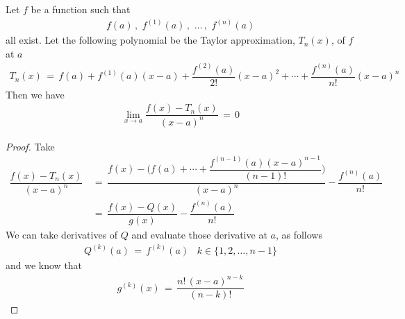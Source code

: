 \begin{theorem}
    Let $f$ be a function such that 
    \begin{align*}
        f(a) \hspace{2pt} , \hspace{4pt} f^{(1)}(a) \hspace{2pt} , \hspace{4pt} \dots \hspace{2pt} , \hspace{4pt} f^{(n)}(a)
    \end{align*}
    all exist. Let the following polynomial be the Taylor approximation, $T_{n}(x)$, of $f$ at $a$
    \begin{align*}
        T_{n}(x) \hspace{2pt} = \hspace{2pt} f(a) + f^{(1)}(a)(x - a) + \dfrac{f^{(2)}(a)}{2!}(x - a)^{2} + \cdots + \dfrac{f^{(n)}(a)}{n!}(x - a)^{n}
    \end{align*}
    Then we have
    \begin{align*}
        \lim_{x \longrightarrow a} \dfrac{f(x) - T_{n}(x)}{(x - a)^{n}} \hspace{2pt} = \hspace{2pt} 0
    \end{align*}
    \begin{proof}
        Take
        \begin{align*}
            \dfrac{f(x) - T_{n}(x)}{(x - a)^{n}} \hspace{2pt} &= \hspace{2pt} \dfrac{f(x) - \Big(f(a) + \cdots + \dfrac{f^{(n-1)}(a) (x - a)^{n-1}}{(n - 1)!} \Big)}{(x - a)^{n}} - \dfrac{f^{(n)}(a)}{n!} \\[2ex]
            &= \hspace{2pt} \dfrac{f(x) - Q(x)}{g(x)} - \dfrac{f^{(n)}(a)}{n!} 
        \end{align*}
        We can take derivatives of $Q$ and evaluate those derivative at $a$, as follows
        \begin{align*}
            Q^{(k)}(a) \hspace{2pt} = \hspace{2pt} f^{(k)}(a) \hspace{10pt} k \in \{1, 2, \dots , n-1\}
        \end{align*}
        and we know that
        \begin{align*}
            g^{(k)}(x) \hspace{2pt} = \hspace{2pt} \dfrac{n! \hspace{2pt} (x - a)^{n - k}}{(n - k)!}

\end{align*}
\end{proof}
\end{theorem}
